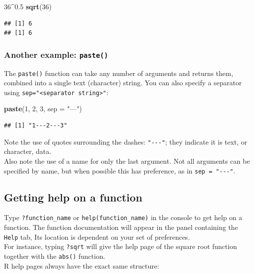\documentclass[]{book}
\newenvironment{Shaded}{\begin{snugshade}}{\end{snugshade}}
\newcommand{\DataTypeTok}[1]{\textcolor[rgb]{0.13,0.29,0.53}{#1}}
\newcommand{\DecValTok}[1]{\textcolor[rgb]{0.00,0.00,0.81}{#1}}
\newcommand{\FloatTok}[1]{\textcolor[rgb]{0.00,0.00,0.81}{#1}}
\newcommand{\KeywordTok}[1]{\textcolor[rgb]{0.13,0.29,0.53}{\textbf{#1}}}
\newcommand{\NormalTok}[1]{#1}
\newcommand{\OperatorTok}[1]{\textcolor[rgb]{0.81,0.36,0.00}{\textbf{#1}}}
\newcommand{\StringTok}[1]{\textcolor[rgb]{0.31,0.60,0.02}{#1}}
\begin{document}
\begin{Shaded}
\begin{Highlighting}[]
\DecValTok{36}\OperatorTok{^}\FloatTok{0.5}
\KeywordTok{sqrt}\NormalTok{(}\DecValTok{36}\NormalTok{)}
\end{Highlighting}
\end{Shaded}

\begin{verbatim}
## [1] 6
## [1] 6
\end{verbatim}

\hypertarget{another-example-paste}{%
\subsubsection*{\texorpdfstring{Another example: \texttt{paste()}}{Another example: paste()}}\label{another-example-paste}}

The \texttt{paste()} function can take any number of arguments and returns them, combined into a single text (character) string. You can also specify a separator using \texttt{sep="\textless{}separator\ string\textgreater{}"}:

\begin{Shaded}
\begin{Highlighting}[]
\KeywordTok{paste}\NormalTok{(}\DecValTok{1}\NormalTok{, }\DecValTok{2}\NormalTok{, }\DecValTok{3}\NormalTok{, }\DataTypeTok{sep =} \StringTok{"---"}\NormalTok{)}
\end{Highlighting}
\end{Shaded}

\begin{verbatim}
## [1] "1---2---3"
\end{verbatim}

Note the use of quotes surrounding the dashes: \texttt{"-\/-\/-"}; they indicate it is text, or character, data.\\
Also note the use of a name for only the last argument. Not all arguments can be specified by name, but when possible this has preference, as in \texttt{sep\ =\ "-\/-\/-"}.

\hypertarget{getting-help-on-a-function}{%
\subsection{Getting help on a function}\label{getting-help-on-a-function}}

Type \texttt{?function\_name} or \texttt{help(function\_name)} in the console to get help on a function. The function documentation will appear in the panel containing the \texttt{Help} tab, Its location is dependent on your set of preferences.\\
For instance, typing \texttt{?sqrt} will give the help page of the square root function together with the \texttt{abs()} function.\\
R help pages always have the exact same structure:
\end{document}
